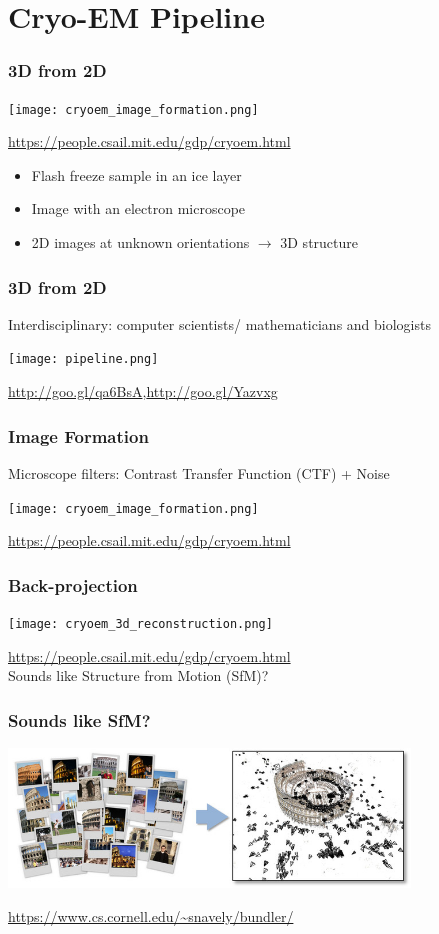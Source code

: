 \documentclass{beamer}
\begin{document}
\section{Cryo-EM Pipeline}
\begin{frame}
\frametitle{3D from 2D}
\begin{center}
\texttt{[image: cryoem\_image\_formation.png]}
\end{center}
\url{https://people.csail.mit.edu/gdp/cryoem.html}
\begin{itemize}
 \item Flash freeze sample in an ice layer
 \item Image with an electron microscope
 \item 2D images at unknown orientations $\rightarrow$ 3D structure
\end{itemize}
\end{frame}

\begin{frame}
\frametitle{3D from 2D}
Interdisciplinary: computer scientists/ mathematicians and biologists
\begin{center}
\texttt{[image: pipeline.png]}\\
\end{center}
\small{
\url{http://goo.gl/qa6BsA},\url{http://goo.gl/Yazvxg}
}
\end{frame}

\begin{frame}
\frametitle{Image Formation}
Microscope filters: Contrast Transfer Function (CTF) + Noise
\begin{center}
\texttt{[image: cryoem\_image\_formation.png]}
\end{center}
\url{https://people.csail.mit.edu/gdp/cryoem.html}
\end{frame}

\begin{frame}
\frametitle{Back-projection}
\begin{center}
\texttt{[image: cryoem\_3d\_reconstruction.png]}
\end{center}
\url{https://people.csail.mit.edu/gdp/cryoem.html}\\
\vspace{5 mm}
Sounds like Structure from Motion (SfM)?
\end{frame}

\begin{frame}
\frametitle{Sounds like SfM?}
\begin{center}
\includegraphics[width=0.8\textwidth]{bundler.jpg}%
\end{center}
\small{\url{https://www.cs.cornell.edu/~snavely/bundler/}}
\end{frame}
\end{document}
